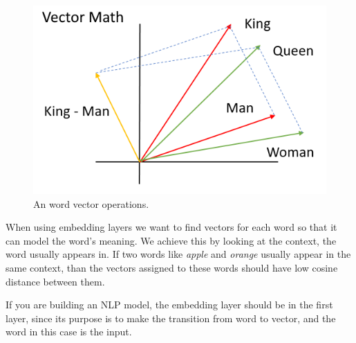 \begin{figure}[!ht]
	\centering
	\includegraphics[scale=0.75, keepaspectratio]{figures/vecs.png}
	\caption{An word vector operations.}
	\label{fig:worvec}
\end{figure}

When using embedding layers we want to find vectors for each word so that it can model the word's meaning. We achieve this by looking at the context, the word usually appears in. If two words like \textit{apple} and \textit{orange} usually appear in the same context, than the vectors assigned to these words should have low cosine distance between them.

If you are building an NLP model, the embedding layer should be in the first layer, since its purpose is to make the transition from word to vector, and the word in this case is the input.


